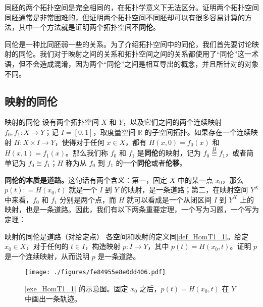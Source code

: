 
同胚的两个拓扑空间是完全相同的，在拓扑学意义下无法区分。证明两个拓扑空间同胚通常是非常困难的，但证明两个拓扑空间不同胚却可以有很多容易计算的方法，其中一个方法就是证明两个拓扑空间不\textbf{同伦}。

同伦是一种比同胚弱一些的关系。为了介绍拓扑空间中的同伦，我们首先要讨论映射的同伦。我们对于映射之间的关系和拓扑空间之间的关系都使用了“同伦”这一术语，但不会造成混淆，因为两个“同伦”之间是相互导出的概念，并且所针对的对象不同。

\subsection{映射的同伦}

\begin{definition}{映射的同伦}\label{def_HomT1_1}
设有两个拓扑空间 $X$ 和 $Y$，以及它们之间的两个连续映射 $f_0, f_1:X\rightarrow Y$；记 $I=[0, 1]$，取度量空间 $\mathbb{R}$ 的子空间拓扑。如果存在一个连续映射 $H: X\times I\rightarrow Y$，使得对于任何 $x\in X$，都有 $H(x, 0)=f_0(x)$ 和 $H(x, 1)=f_1(x)$。那么我们称 $f_0$ 和 $f_1$ 是\textbf{同伦}的映射，记为 $f_0\overset{H}{\cong} f_1$，或者简单记为 $f_0\cong f_1$；$H$ 称为从 $f_0$ 到 $f_1$ 的一个\textbf{同伦}或者\textbf{伦移}。

\end{definition}

\textbf{同伦的本质是道路。}这句话有两个含义：第一，固定 $X$ 中的某一点 $x_0$，那么 $p(t): = H(x_0, t)$ 就是一个 $I$ 到 $Y$ 的映射，是一条道路；第二，在映射空间 $Y^X$ 中来看，$f_0$ 和 $f_1$ 分别是两个点，而 $H$ 就可以看成是一个从闭区间 $I$ 到 $Y^X$ 上的映射，也是一条道路。因此，我们有以下两条重要定理，一个写为习题，一个写为定理：

\begin{exercise}{映射的同伦是道路（对给定点）}\label{exe_HomT1_1}
各空间和映射的定义同\autoref{def_HomT1_1}。给定 $x_0\in X$，对于任何的 $t\in I$，构造映射 $p:I\rightarrow Y$，其中 $p(t)=H(x_0, t)$。证明 $p$ 是一个连续映射，从而说明 $p$ 是一条道路。
\end{exercise}

\begin{figure}[ht]
\centering
\texttt{[image: ./figures/fe84955e8e0dd406.pdf]}
\caption{\autoref{exe_HomT1_1} 的示意图。固定 $x_0$ 之后，$p(t)=H(x_0, t)$ 在 $Y$ 中画出一条轨迹。} \label{fig_HomT1_1}
\end{figure}



